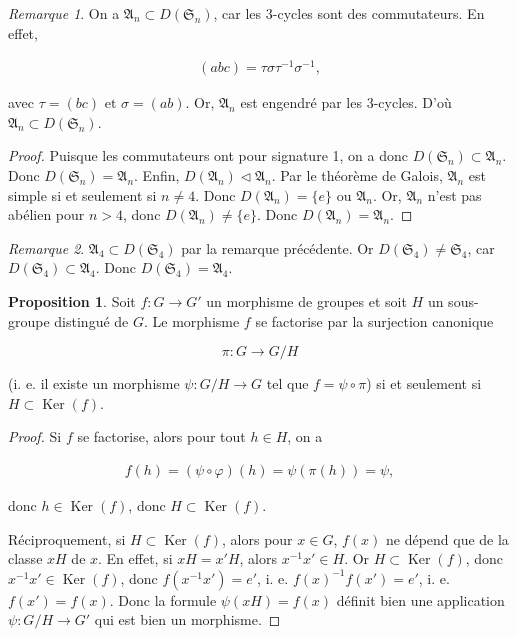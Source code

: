 \documentclass[french]{book}
\theoremstyle{definition}
\newtheorem{protoproposition}{Proposition}[section]
\newenvironment{prop}
    {\colorlet{shadecolor}{blue!5}\begin{shaded}\begin{protoproposition}}
    {\end{protoproposition}\end{shaded}}
\theoremstyle{remark}
\newtheorem*{remark}{Remarque}
\newcommand{\biggg}{>}
\newcommand{\bg}{\biggg}
\begin{document}
\begin{remark}
  On a \(\mathfrak{A}_n \subset D(\mathfrak{S}_n)\), car les 3-cycles sont des commutateurs. En effet,

  \begin{gather*}
    (a b c) = \tau \sigma \tau ^{-1} \sigma ^{-1},
  \end{gather*}

  avec \(\tau = (bc) \text{ et } \sigma = (a b)\). Or, \(\mathfrak{A}_n\) est engendré par les 3-cycles. D'où \(\mathfrak{A}_n \subset D(\mathfrak{S}_n)\).
\end{remark}

\begin{proof}
  Puisque les commutateurs ont pour signature 1, on a donc \(D(\mathfrak{S}_{n}) \subset \mathfrak{A}_n\). Donc \(D(\mathfrak{S}_n) = \mathfrak{A}_n\). Enfin, \(D(\mathfrak{A}_n) \triangleleft \mathfrak{A}_n\). Par le théorème de Galois, \(\mathfrak{A}_n\) est simple si et seulement si \(n \neq 4\). Donc \(D(\mathfrak{A}_n) = \{ e \}\) ou \(\mathfrak{A}_n\). Or, \(\mathfrak{A}_n\) n'est pas abélien pour \(n \bg 4\), donc \(D(\mathfrak{A}_n) \neq \{ e \}\). Donc \(D(\mathfrak{A}_n) =\mathfrak{A}_n\).
\end{proof}

\begin{remark}
  \(\mathfrak{A}_4 \subset D(\mathfrak{S}_{4})\) par la remarque précédente. Or \(D(\mathfrak{S}_{4}) \neq \mathfrak{S}_{4}\), car \(D(\mathfrak{S}_{4}) \subset \mathfrak{A}_4\). Donc \(D(\mathfrak{S}_{4}) = \mathfrak{A}_4\).
\end{remark}

\begin{prop}\label{se-factorise}
  Soit \(f : G \longrightarrow G'\) un morphisme de groupes et soit \(H\) un sous-groupe distingué de \(G\). Le morphisme \(f\) se factorise par la surjection canonique

  \[\pi : G \longrightarrow G/H\]

  (i. e. il existe un morphisme \(\psi : G/H \longrightarrow G\) tel que \(f = \psi \circ \pi\)) si et seulement si \(H \subset \operatorname{Ker}(f)\).
\end{prop}

\begin{proof}
  Si \(f\) se factorise, alors pour tout \(h \in H\), on a

  \begin{gather*}
    f(h) = (\psi \circ \varphi)(h) = \psi(\pi(h)) = \psi,
  \end{gather*}

  donc \(h \in \operatorname{Ker}(f)\), donc \(H \subset \operatorname{Ker}(f)\).

  Réciproquement, si \(H \subset \operatorname{Ker}(f)\), alors pour \( x \in G\), \(f(x)\) ne dépend que de la classe \(xH\) de \(x\). En effet, si \(xH = x'H\), alors \(x ^{-1} x' \in H\). Or \(H \subset \operatorname{Ker}(f)\), donc \(x ^{-1} x' \in \operatorname{Ker}(f)\), donc \(f(x ^{-1} x') = e'\), i. e. \(f(x) ^{-1} f(x') = e'\), i. e. \(f(x') = f(x)\).
  Donc la formule \(\psi(xH) = f(x)\) définit bien une application \(\psi : G/H \longrightarrow G'\) qui est bien un morphisme.
\end{proof}
\end{document}
